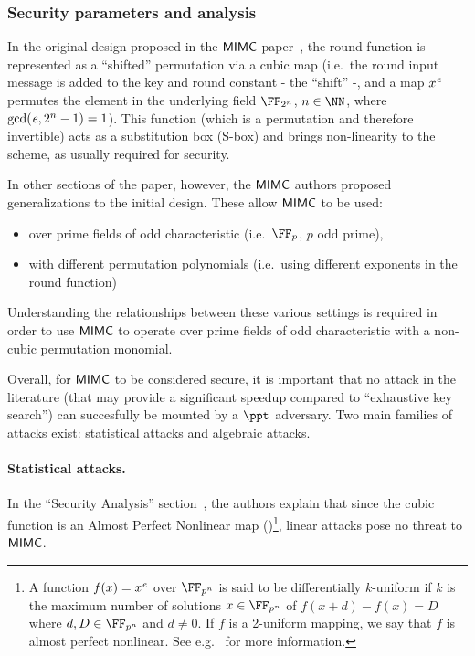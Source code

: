\subsubsection{Security parameters and analysis}\label{instantiation:mkhash:mimc-encryption:security}

In the original design proposed in the $\mathsf{MIMC{}}$ paper~\cite{albrecht2016mimc}, the round function is represented as a ``shifted'' permutation via a cubic map (i.e.~the round input message is added to the key and round constant - the ``shift'' -, and a map $x^{\mathit{e}{}}$ permutes the element in the underlying field $\FFx{2^n}$, $n \in \NN$, where $\gcd(\mathit{e}{}, 2^n - 1) = 1$). This function (which is a permutation and therefore invertible) acts as a substitution box (S-box) and brings non-linearity to the scheme, as usually required for security.

In other sections of the paper, however, the $\mathsf{MIMC{}}$ authors proposed generalizations to the initial design. These allow $\mathsf{MIMC{}}$ to be used:
\begin{itemize}
    \item over prime fields of odd characteristic (i.e.~$\FFx{p}$, $p$ odd prime),
    \item with different permutation polynomials (i.e.~using different exponents in the round function)
\end{itemize}

Understanding the relationships between these various settings is required in order to use $\mathsf{MIMC{}}$ to operate over prime fields of odd characteristic with a non-cubic permutation monomial.

Overall, for $\mathsf{MIMC{}}$ to be considered secure, it is important that no attack in the literature (that may provide a significant speedup compared to ``exhaustive key search'') can succesfully be mounted by a $\ppt$ adversary. Two main families of attacks exist: statistical attacks and algebraic attacks.

\paragraph{Statistical attacks.}

In the ``Security Analysis'' section~\cite[Section 4.2]{albrecht2016mimc}, the authors explain that since the cubic function is an Almost Perfect Nonlinear map (\apn)\footnote{A function $f(x) = x^{\mathit{e}{}}$ over $\FFx{p^n}$ is said to be differentially $k$-uniform if $k$ is the maximum number of solutions $x \in \FFx{p^n}$ of $f(x + d) - f (x) = D$ where $d, D \in \FFx{p^n}$ and $d \neq 0$. If $f$ is a 2-uniform mapping, we say that $f$ is almost perfect nonlinear. See e.g.~\cite{DBLP:journals/tit/HellesethRS99} for more information.}, linear attacks pose no threat to $\mathsf{MIMC{}}$.

